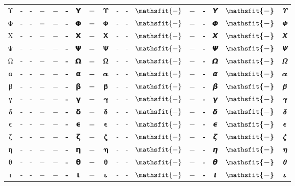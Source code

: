 \documentclass{standalone}
\newcommand{\SANS}[1]{\ifmmode\mathsf{#1}\else\textsf{#1}\fi}
\newcommand{\BSANS}[1]{\ifmmode\boldsymbol{\mathsf{#1}}\else\textbf{\textsf{#1}}\fi}
\newcommand{\ISANS}[1]{\ifmmode\mathsfit{#1}\else\textit{\textsf{#1}}\fi}
\newcommand{\BISANS}[1]{\ifmmode\bm{\mathsfit{#1}}\else\textbf{\textsf{\textit{#1}}}\fi}
\begin{document}
\begin{tabular}{c|cc|cc|cc|cc|cc|cc|cc|cc}
Υ & \SANS{-} & - & $\SANS{-}$ & $-$ & \BSANS{-} & 𝝪 & $\BSANS{-}$ & $𝝪$ & \ISANS{-} & - & $\ISANS{-}$ & $-$ & \BISANS{-} & 𝞤 & $\BISANS{-}$ & $𝞤$ \\
Φ & \SANS{-} & - & $\SANS{-}$ & $-$ & \BSANS{-} & 𝝫 & $\BSANS{-}$ & $𝝫$ & \ISANS{-} & - & $\ISANS{-}$ & $-$ & \BISANS{-} & 𝞥 & $\BISANS{-}$ & $𝞥$ \\
Χ & \SANS{-} & - & $\SANS{-}$ & $-$ & \BSANS{-} & 𝝬 & $\BSANS{-}$ & $𝝬$ & \ISANS{-} & - & $\ISANS{-}$ & $-$ & \BISANS{-} & 𝞦 & $\BISANS{-}$ & $𝞦$ \\
Ψ & \SANS{-} & - & $\SANS{-}$ & $-$ & \BSANS{-} & 𝝭 & $\BSANS{-}$ & $𝝭$ & \ISANS{-} & - & $\ISANS{-}$ & $-$ & \BISANS{-} & 𝞧 & $\BISANS{-}$ & $𝞧$ \\
Ω & \SANS{-} & - & $\SANS{-}$ & $-$ & \BSANS{-} & 𝝮 & $\BSANS{-}$ & $𝝮$ & \ISANS{-} & - & $\ISANS{-}$ & $-$ & \BISANS{-} & 𝞨 & $\BISANS{-}$ & $𝞨$ \\
\midrule
α & \SANS{-} & - & $\SANS{-}$ & $-$ & \BSANS{-} & 𝝰 & $\BSANS{-}$ & $𝝰$ & \ISANS{-} & - & $\ISANS{-}$ & $-$ & \BISANS{-} & 𝞪 & $\BISANS{-}$ & $𝞪$ \\
β & \SANS{-} & - & $\SANS{-}$ & $-$ & \BSANS{-} & 𝝱 & $\BSANS{-}$ & $𝝱$ & \ISANS{-} & - & $\ISANS{-}$ & $-$ & \BISANS{-} & 𝞫 & $\BISANS{-}$ & $𝞫$ \\
γ & \SANS{-} & - & $\SANS{-}$ & $-$ & \BSANS{-} & 𝝲 & $\BSANS{-}$ & $𝝲$ & \ISANS{-} & - & $\ISANS{-}$ & $-$ & \BISANS{-} & 𝞬 & $\BISANS{-}$ & $𝞬$ \\
δ & \SANS{-} & - & $\SANS{-}$ & $-$ & \BSANS{-} & 𝝳 & $\BSANS{-}$ & $𝝳$ & \ISANS{-} & - & $\ISANS{-}$ & $-$ & \BISANS{-} & 𝞭 & $\BISANS{-}$ & $𝞭$ \\
ϵ & \SANS{-} & - & $\SANS{-}$ & $-$ & \BSANS{-} & 𝞊 & $\BSANS{-}$ & $𝞊$ & \ISANS{-} & - & $\ISANS{-}$ & $-$ & \BISANS{-} & 𝟄 & $\BISANS{-}$ & $𝟄$ \\
ζ & \SANS{-} & - & $\SANS{-}$ & $-$ & \BSANS{-} & 𝝵 & $\BSANS{-}$ & $𝝵$ & \ISANS{-} & - & $\ISANS{-}$ & $-$ & \BISANS{-} & 𝞯 & $\BISANS{-}$ & $𝞯$ \\
η & \SANS{-} & - & $\SANS{-}$ & $-$ & \BSANS{-} & 𝝶 & $\BSANS{-}$ & $𝝶$ & \ISANS{-} & - & $\ISANS{-}$ & $-$ & \BISANS{-} & 𝞰 & $\BISANS{-}$ & $𝞰$ \\
θ & \SANS{-} & - & $\SANS{-}$ & $-$ & \BSANS{-} & 𝝷 & $\BSANS{-}$ & $𝝷$ & \ISANS{-} & - & $\ISANS{-}$ & $-$ & \BISANS{-} & 𝞱 & $\BISANS{-}$ & $𝞱$ \\
ι & \SANS{-} & - & $\SANS{-}$ & $-$ & \BSANS{-} & 𝝸 & $\BSANS{-}$ & $𝝸$ & \ISANS{-} & - & $\ISANS{-}$ & $-$ & \BISANS{-} & 𝞲 & $\BISANS{-}$ & $𝞲$ \\

\end{tabular}
\end{document}
